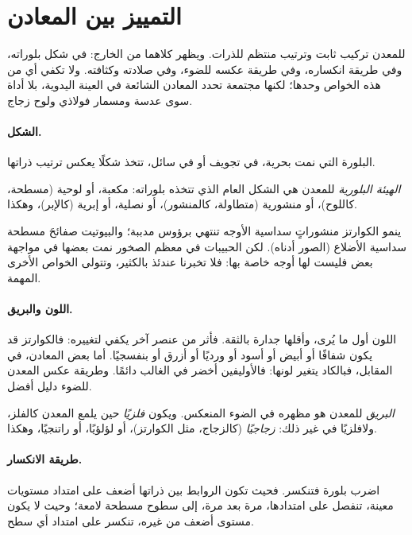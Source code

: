 \section{التمييز بين المعادن}

للمعدن تركيب ثابت وترتيب منتظم للذرات. ويظهر كلاهما
من الخارج: في شكل بلوراته، وفي طريقة انكساره، وفي طريقة
عكسه للضوء، وفي صلادته وكثافته. ولا تكفي أي من هذه الخواص
وحدها؛ لكنها مجتمعة تحدد المعادن الشائعة في العينة اليدوية،
بلا أداة سوى عدسة ومسمار فولاذي ولوح زجاج.

\paragraph{الشكل.} البلورة التي نمت بحرية، في تجويف أو في سائل،
تتخذ شكلًا يعكس ترتيب ذراتها.

\begin{definition}\label{def:g11:minerals:habit}
\emph{الهيئة البلورية} للمعدن هي الشكل العام
الذي تتخذه بلوراته: مكعبة، أو لوحية (مسطحة، كاللوح)، أو منشورية
(متطاولة، كالمنشور)، أو نصلية، أو إبرية (كالإبر)، وهكذا.
\end{definition}

ينمو الكوارتز منشوراتٍ سداسية الأوجه تنتهي برؤوس مدببة؛ والبيوتيت صفائحَ مسطحة
سداسية الأضلاع (الصور أدناه). لكن الحبيبات في معظم الصخور نمت
بعضها في مواجهة بعض فليست لها أوجه خاصة بها: فلا تخبرنا  عندئذ بالكثير،
وتتولى الخواص الأخرى المهمة.

\paragraph{اللون والبريق.} اللون أول ما يُرى،
وأقلها جدارة بالثقة. فأثر من عنصر آخر يكفي لتغييره: فالكوارتز
قد يكون شفافًا أو أبيض أو أسود أو ورديًا أو أزرق أو بنفسجيًا. أما بعض المعادن، في
المقابل، فبالكاد يتغير لونها: فالأوليفين أخضر في الغالب دائمًا. وطريقة عكس المعدن
للضوء دليل أفضل.

\begin{definition}[البريق]\label{def:g11:minerals:lustre}
\emph{البريق} للمعدن هو مظهره في الضوء
المنعكس. ويكون \emph{فلزيًا} حين يلمع المعدن كالفلز،
ولافلزيًا في غير ذلك: \emph{زجاجيًا} (كالزجاج، مثل الكوارتز)، أو لؤلؤيًا، أو
راتنجيًا، وهكذا.
\end{definition}

\paragraph{طريقة الانكسار.} اضرب بلورة فتنكسر. فحيث تكون
الروابط بين ذراتها أضعف على امتداد مستويات معينة، تنفصل على امتدادها،
مرة بعد مرة، إلى سطوح مسطحة لامعة؛ وحيث لا يكون مستوى أضعف
من غيره، تنكسر على امتداد أي سطح.

